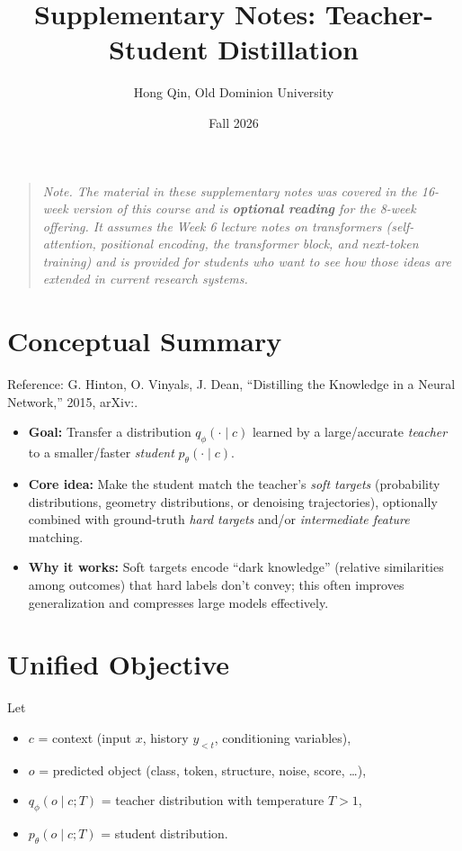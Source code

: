 \documentclass[11pt]{article}
\title{Supplementary Notes: Teacher-Student Distillation}
\author{Hong Qin, Old Dominion University}
\date{Fall 2026}
\theoremstyle{remark}
\begin{document}
\maketitle

\begin{quote}\small\itshape Note. The material in these supplementary notes was covered in the 16-week version of this course and is \textbf{optional reading} for the 8-week offering. It assumes the Week 6 lecture notes on transformers (self-attention, positional encoding, the transformer block, and next-token training) and is provided for students who want to see how those ideas are extended in current research systems.\end{quote}

\tableofcontents
\newpage

\section{Conceptual Summary}

Reference: G. Hinton, O. Vinyals, J. Dean, ``Distilling the Knowledge in a Neural Network,'' 2015, arXiv:.

\begin{itemize}
    \item \textbf{Goal:} Transfer a distribution $q_\phi(\cdot \mid c)$ learned by a large/accurate \emph{teacher} to a smaller/faster \emph{student} $p_\theta(\cdot \mid c)$.
    \item \textbf{Core idea:} Make the student match the teacher's \emph{soft targets} (probability distributions, geometry distributions, or denoising trajectories), optionally combined with ground-truth \emph{hard targets} and/or \emph{intermediate feature} matching.
    \item \textbf{Why it works:} Soft targets encode ``dark knowledge'' (relative similarities among outcomes) that hard labels don't convey; this often improves generalization and compresses large models effectively.
\end{itemize}

\section{Unified Objective}
Let
\begin{itemize}[nosep]
    \item $c$ = context (input $x$, history $y_{<t}$, conditioning variables),
    \item $o$ = predicted object (class, token, structure, noise, score, \ldots),
    \item $q_\phi(o \mid c; T)$ = teacher distribution with temperature $T>1$,
    \item $p_\theta(o \mid c; T)$ = student distribution.
\end{itemize}
\end{document}
